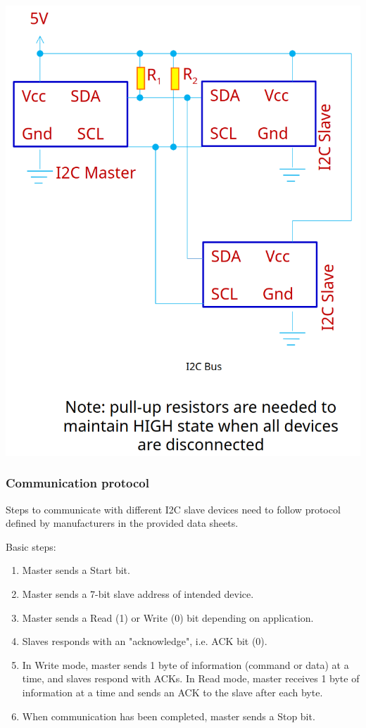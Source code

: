 \documentclass[11pt]{article}
\begin{document}
\begin{center}
\includegraphics[scale=0.6]{./images/i2c-bus-diagram.png}
\end{center}
\subsubsection{Communication protocol}
\label{sec:org6d23aca}
Steps to communicate with different I2C slave devices need to follow protocol defined by manufacturers in the provided data sheets.


Basic steps:
\begin{enumerate}
\item Master sends a Start bit.
\item Master sends a 7-bit slave address of intended device.
\item Master sends a Read (1) or Write (0) bit depending on application.
\item Slaves responds with an "acknowledge", i.e. ACK bit (0).
\item In Write mode, master sends 1 byte of information (command or data) at a time, and slaves respond with ACKs. In Read mode, master receives 1 byte of information at a time and sends an ACK to the slave after each byte.
\item When communication has been completed, master sends a Stop bit.
\end{enumerate}
\end{document}
